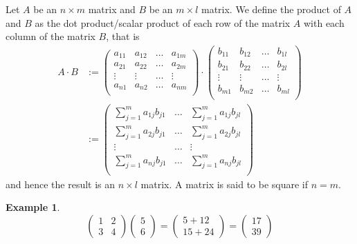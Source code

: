 \documentclass[a4paper,11pt]{article}
\newtheorem{example}{Example}
\begin{document}
Let $A$ be an $n \times m$ matrix and $B$ be an $m \times l$ matrix. We define the product of $A$ and $B$ as the dot product/scalar product of each row of the matrix $A$ with each column of the matrix $B$, that is
\begin{equation}
\begin{split}
A \cdot B &:=\begin{pmatrix}
a_{11} & a_{12} & \dots & a_{1m} \\
a_{21} & a_{22} & \dots & a_{2m} \\
\vdots &  \vdots & \dots &\vdots\\
a_{n1} & a_{n2} & \dots & a_{nm} \\
\end{pmatrix}\cdot
\begin{pmatrix}
b_{11} & b_{12} & \dots & b_{1l} \\
b_{21} & b_{22} & \dots & b_{2l} \\
\vdots &  \vdots & \dots &\vdots\\
b_{m1} & b_{m2} & \dots & b_{ml} \\
\end{pmatrix}
\\ &:=
\begin{pmatrix}
\sum_{j=1}^m a_{1j}b_{j1} & \dots & \sum_{j=1}^m a_{1j}b_{jl} \\
\sum_{j=1}^m a_{2j}b_{j1} & \dots & \sum_{j=1}^m a_{2j}b_{jl} \\
\vdots & \dots & \vdots \\
\sum_{j=1}^m a_{nj}b_{j1} & \dots & \sum_{j=1}^m a_{nj}b_{jl} \\
\end{pmatrix}
\end{split}
\end{equation}
and hence the result is an $n \times l$ matrix. A matrix is said to be square if $n = m$.

\begin{example}
$$
\begin{pmatrix}
1 & 2 \\
3 & 4
\end{pmatrix}
\begin{pmatrix}
5 \\ 6
\end{pmatrix}
=\begin{pmatrix}
5 + 12 \\
15 + 24 
\end{pmatrix}
=\begin{pmatrix}
17\\39
\end{pmatrix}
$$
\end{example}
\end{document}
